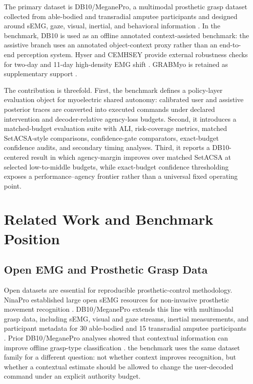 \documentclass[journal]{IEEEtran}
\newcommand{\dbten}{DB10/MeganePro}
\begin{document}
The primary dataset is \dbten, a multimodal prosthetic grasp dataset collected from able-bodied and transradial amputee participants and designed around sEMG, gaze, visual, inertial, and behavioral information \cite{Cognolato2020MeganePro}. In the benchmark, DB10 is used as an offline annotated context-assisted benchmark: the assistive branch uses an annotated object-context proxy rather than an end-to-end perception system. Hyser and CEMHSEY provide external robustness checks for two-day and 11-day high-density EMG shift \cite{Jiang2021Hyser,Jiang2023HyserPhysioNet,Yang2025CEMHSEY}. GRABMyo is retained as supplementary support \cite{Pradhan2022GRABMyo,Jiang2024GRABMyoPhysioNet}.

The contribution is threefold. First, the benchmark defines a policy-layer evaluation object for myoelectric shared autonomy: calibrated user and assistive posterior traces are converted into executed commands under declared intervention and decoder-relative agency-loss budgets. Second, it introduces a matched-budget evaluation suite with ALI, risk-coverage metrics, matched SetACSA-style comparisons, confidence-gate comparators, exact-budget confidence audits, and secondary timing analyses. Third, it reports a DB10-centered result in which agency-margin improves over matched SetACSA at selected low-to-middle budgets, while exact-budget confidence thresholding exposes a performance--agency frontier rather than a universal fixed operating point.

\section{Related Work and Benchmark Position}
\subsection{Open EMG and Prosthetic Grasp Data}
Open datasets are essential for reproducible prosthetic-control methodology. NinaPro established large open sEMG resources for non-invasive prosthetic movement recognition \cite{Atzori2014Ninapro}. DB10/MeganePro extends this line with multimodal grasp data, including sEMG, visual and gaze streams, inertial measurements, and participant metadata for 30 able-bodied and 15 transradial amputee participants \cite{Cognolato2020MeganePro}. Prior DB10/MeganePro analyses showed that contextual information can improve offline grasp-type classification \cite{Cognolato2022EyeVision,Wang2022VisionSEMG}. the benchmark uses the same dataset family for a different question: not whether context improves recognition, but whether a contextual estimate should be allowed to change the user-decoded command under an explicit authority budget.
\end{document}
